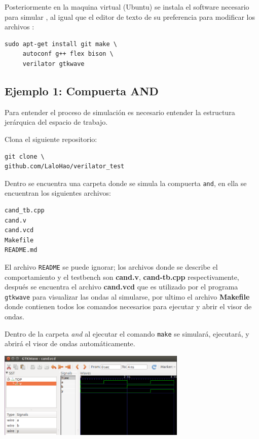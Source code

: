 \documentclass[11pt]{/home/hao/dev/org/latex-plantilla/IEEEtran}
\begin{document}
Posteriormente en la maquina virtual (Ubuntu) se instala el software
necesario para simular \cite{verilator-instalacion}, al igual que el
editor de texto de su preferencia para modificar los archivos :

\begin{verbatim}
sudo apt-get install git make \
     autoconf g++ flex bison \
     verilator gtkwave
\end{verbatim}
\subsection{Ejemplo 1: Compuerta AND}
\label{sec:org2d26986}
Para entender el proceso de simulación es necesario entender la
estructura jerárquica del espacio de trabajo.

Clona el siguiente repositorio:

\begin{verbatim}
git clone \
github.com/LaloHao/verilator_test
\end{verbatim}

Dentro se encuentra una carpeta donde se simula la compuerta \texttt{and},
en ella se encuentran los siguientes archivos:

\begin{verbatim}
cand_tb.cpp
cand.v
cand.vcd
Makefile
README.md
\end{verbatim}

El archivo \texttt{README} se puede ignorar; los archivos donde se
describe el comportamiento y el testbench son \textbf{cand.v},
\textbf{cand-tb.cpp} respectivamente, después se encuentra el archivo
\textbf{cand.vcd} que es utilizado por el programa \texttt{gtkwave} para
visualizar las ondas al simularse, por ultimo el archivo \textbf{Makefile}
donde contienen todos los comandos necesarios para ejecutar y abrir
el visor de ondas.

Dentro de la carpeta \emph{and} al ejecutar el comando \texttt{make} se
simulará, ejecutará, y abrirá el visor de ondas automáticamente.

\begin{center}
\includegraphics[width=9cm]{data/51/264eef-d888-4bbb-933e-983c0be58cb7/screenshot-20170217-105525.png}
\end{center}
\end{document}
